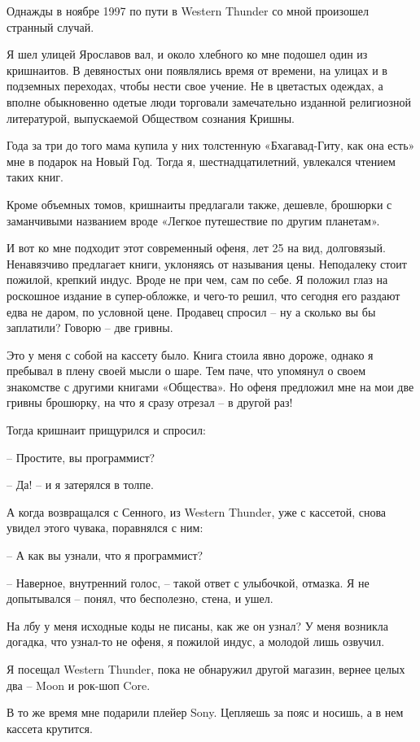 Однажды в ноябре 1997 по пути в Western Thunder со мной произошел странный случай.

Я шел улицей Ярославов вал, и около хлебного ко мне подошел один из кришнаитов. В девяностых они появлялись время от времени, на улицах и в подземных переходах, чтобы нести свое учение. Не в цветастых одеждах, а вполне обыкновенно одетые люди торговали замечательно изданной религиозной литературой, выпускаемой Обществом сознания Кришны.

Года за три до того мама купила у них толстенную «Бхагавад-Гиту, как она есть» мне в подарок на Новый Год. Тогда я, шестнадцатилетний, увлекался чтением таких книг.

Кроме объемных томов, кришнаиты предлагали также, дешевле, брошюрки с заманчивыми названием вроде «Легкое путешествие по другим планетам».

И вот ко мне подходит этот современный офеня, лет 25 на вид, долговязый. Ненавязчиво предлагает книги, уклоняясь от называния цены. Неподалеку стоит пожилой, крепкий индус. Вроде не при чем, сам по себе. Я положил глаз на роскошное издание в супер-обложке, и чего-то решил, что сегодня его раздают едва не даром, по условной цене. Продавец спросил – ну а сколько вы бы заплатили? Говорю – две гривны.

Это у меня с собой на кассету было. Книга стоила явно дороже, однако я пребывал в плену своей мысли о шаре. Тем паче, что упомянул о своем знакомстве с другими книгами «Общества». Но офеня предложил мне на мои две гривны брошюрку, на что я сразу отрезал – в другой раз!

Тогда кришнаит прищурился и спросил:

   – Простите, вы программист?

   – Да! – и я затерялся в толпе.

А когда возвращался с Сенного, из Western Thunder, уже с кассетой, снова увидел этого чувака, поравнялся с ним:

   – А как вы узнали, что я программист?

   – Наверное, внутренний голос, – такой ответ с улыбочкой, отмазка. Я не допытывался – понял, что бесполезно, стена, и ушел.

На лбу у меня исходные коды не писаны, как же он узнал? У меня возникла догадка, что узнал-то не офеня, я пожилой индус, а молодой лишь озвучил.

Я посещал Western Thunder, пока не обнаружил другой магазин, вернее целых два – Moon и рок-шоп Core. 

В то же время мне подарили плейер Sony. Цепляешь за пояс и носишь, а в нем кассета крутится. 


